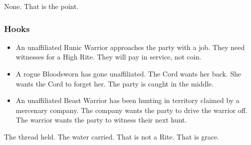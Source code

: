 None. That is the point.

\subsubsection{Hooks}

\begin{itemize}
\item An unaffiliated Runic Warrior approaches the party with a job. They need witnesses for a High Rite. They will pay in service, not coin.
\item A rogue Bloodsworn has gone unaffiliated. The Cord wants her back. She wants the Cord to forget her. The party is caught in the middle.
\item An unaffiliated Beast Warrior has been hunting in territory claimed by a mercenary company. The company wants the party to drive the warrior off. The warrior wants the party to witness their next hunt.
\end{itemize}

The thread held. The water carried. That is not a Rite. That is grace.
